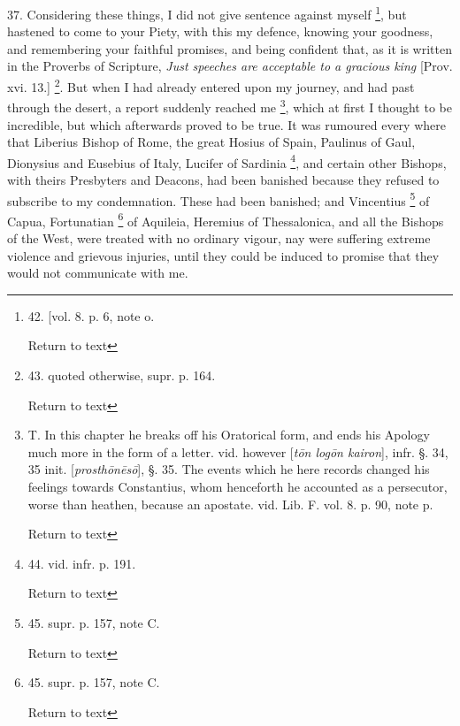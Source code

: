 37. Considering these things, I did not give sentence against myself \footnote{42. [vol. 8. p. 6, note o.

Return to text}, but hastened to come to your Piety, with this my defence,
knowing your goodness, and remembering your faithful promises, and
being confident that, as it is written in the Proverbs of Scripture, \emph{Just
speeches are acceptable to a gracious king} [Prov. xvi. 13.] \footnote{43. quoted otherwise, supr. p. 164.

Return to text}. But when I had already entered upon my journey, and had past
through the desert, a report suddenly reached me \footnote{T. In this chapter he breaks off his Oratorical form, and ends his
Apology much more in the form of a letter. vid. however [\emph{t\={o}n
log\={o}n kairon}], infr. §. 34, 35 init. [\emph{prosth\={o}n\={e}s\={o}}],
§. 35. The events which he here records changed his feelings towards
Constantius, whom henceforth he accounted as a persecutor, worse than
heathen, because an apostate. vid. Lib. F. vol. 8. p. 90, note p.

Return to text}, which at first I thought to be incredible, but which
afterwards proved to be true. It was rumoured every where that
Liberius Bishop of Rome, the great Hosius of Spain, Paulinus of Gaul,
Dionysius and Eusebius of Italy, Lucifer of Sardinia \footnote{44. vid. infr. p. 191.

Return to text}, and certain other Bishops, with theirs Presbyters and
Deacons, had been banished because they refused to subscribe to my
condemnation. These had been banished; and Vincentius \footnote{45. supr. p. 157, note C.

Return to text} of Capua, Fortunatian \footnote{45. supr. p. 157, note C.

Return to text} of
Aquileia, Heremius of Thessalonica, and all the Bishops of the West,
were treated with no ordinary vigour, nay were suffering extreme
violence and grievous injuries, until they could be induced to promise
that they would not communicate with me.

